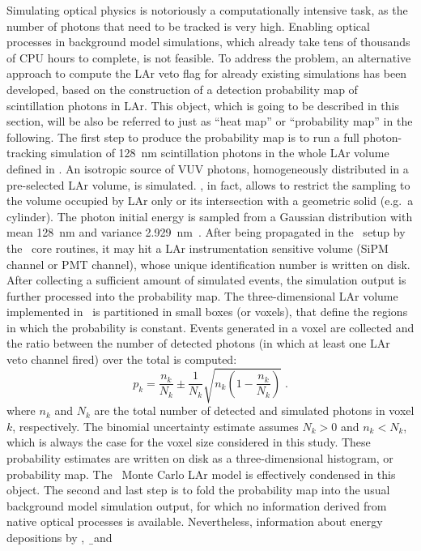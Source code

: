 Simulating optical physics is notoriously a computationally intensive task, as the number
of photons that need to be tracked is very high. Enabling optical processes in background
model simulations, which already take tens of thousands of CPU hours to complete, is not
feasible. To address the problem, an alternative approach to compute the LAr veto flag for
already existing simulations has been developed, based on the construction of a detection
probability map of scintillation photons in LAr. This object, which is going to be
described in this section, will be also be referred to just as ``heat map'' or
``probability map'' in the following.
\newpar
The first step to produce the probability map is to run a full photon-tracking simulation
of 128~nm scintillation photons in the whole LAr volume defined in \mage. An isotropic
source of VUV photons, homogeneously distributed in a pre-selected LAr volume, is
simulated.  \mage, in fact, allows to restrict the sampling to the volume occupied by LAr
only or its intersection with a geometric solid (e.g.~a cylinder). The photon initial
energy is sampled from a Gaussian distribution with mean 128~nm and variance
2.929~nm~\cite{Heindl2010}. After being propagated in the \gerda\ setup by the \geant\
core routines, it may hit a LAr instrumentation sensitive volume (SiPM channel or PMT
channel), whose unique identification number is written on disk. After collecting
a sufficient amount of simulated events, the simulation output is further processed into
the probability map. The three-dimensional LAr volume implemented in \mage\ is partitioned
in small boxes (or voxels), that define the regions in which the probability is constant.
Events generated in a voxel are collected and the ratio between the number of detected
photons (in which at least one LAr veto channel fired) over the total is computed:
\[
  p_k = \frac{n_k}{N_k} \pm \frac{1}{N_k}\sqrt{n_k \left(1 - \frac{n_k}{N_k} \right)} \;.
\]
where $n_k$ and $N_k$ are the total number of detected and simulated photons in voxel $k$,
respectively. The binomial uncertainty estimate assumes $N_k>0$ and $n_k<N_k$, which is
always the case for the voxel size considered in this study.  These probability estimates
are written on disk as a three-dimensional histogram, or probability map. The \gerda\
Monte Carlo LAr model is effectively condensed in this object.
\newpar
The second and last step is to fold the probability map into the usual background model
simulation output, for which no information derived from native optical processes is
available.  Nevertheless, information about energy depositions by \g, \b\ and \a\
